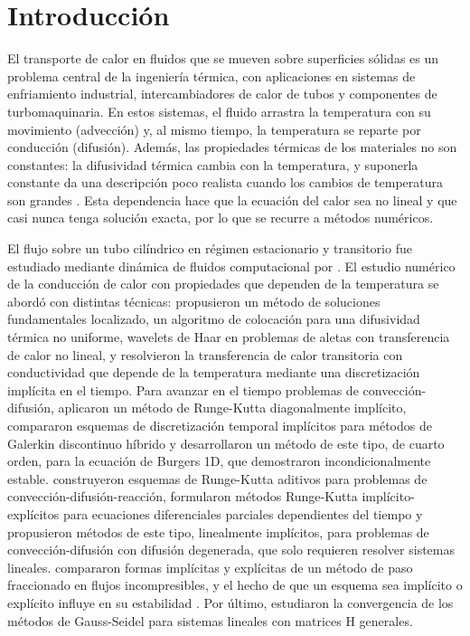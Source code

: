 \documentclass[final,5p,times,twocolumn,authoryear,11pt]{elsarticle}
\begin{document}

\section{Introducción}
\label{sec:introduccion}

El transporte de calor en fluidos que se mueven sobre superficies sólidas es un problema central de la ingeniería térmica, con aplicaciones en sistemas de enfriamiento industrial, intercambiadores de calor de tubos y componentes de turbomaquinaria. En estos sistemas, el fluido arrastra la temperatura con su movimiento (advección) y, al mismo tiempo, la temperatura se reparte por conducción (difusión). Además, las propiedades térmicas de los materiales no son constantes: la difusividad térmica cambia con la temperatura, y suponerla constante da una descripción poco realista cuando los cambios de temperatura son grandes \citep{Wang2022, Filipov2023}. Esta dependencia hace que la ecuación del calor sea no lineal y que casi nunca tenga solución exacta, por lo que se recurre a métodos numéricos.

El flujo sobre un tubo cilíndrico en régimen estacionario y transitorio fue estudiado mediante dinámica de fluidos computacional por \citet{Singh2024}. El estudio numérico de la conducción de calor con propiedades que dependen de la temperatura se abordó con distintas técnicas: \citet{Wang2022} propusieron un método de soluciones fundamentales localizado, \citet{Ejaz2024} un algoritmo de colocación para una difusividad térmica no uniforme, \citet{MtAznam2019} wavelets de Haar en problemas de aletas con transferencia de calor no lineal, y \citet{Filipov2023} resolvieron la transferencia de calor transitoria con conductividad que depende de la temperatura mediante una discretización implícita en el tiempo. Para avanzar en el tiempo problemas de convección-difusión, \citet{Deng2014} aplicaron un método de Runge-Kutta diagonalmente implícito, \citet{Levy2022} compararon esquemas de discretización temporal implícitos para métodos de Galerkin discontinuo híbrido y \citet{Deng2015} desarrollaron un método de este tipo, de cuarto orden, para la ecuación de Burgers 1D, que demostraron incondicionalmente estable. \citet{Kennedy2003} construyeron esquemas de Runge-Kutta aditivos para problemas de convección-difusión-reacción, \citet{Ascher1997} formularon métodos Runge-Kutta implícito-explícitos para ecuaciones diferenciales parciales dependientes del tiempo y \citet{Boscarino2015} propusieron métodos de este tipo, linealmente implícitos, para problemas de convección-difusión con difusión degenerada, que solo requieren resolver sistemas lineales. \citet{Bevan2016} compararon formas implícitas y explícitas de un método de paso fraccionado en flujos incompresibles, y el hecho de que un esquema sea implícito o explícito influye en su estabilidad \citep{Butcher1996}. Por último, \citet{Zhang2015} estudiaron la convergencia de los métodos de Gauss-Seidel para sistemas lineales con matrices H generales.
\end{document}
